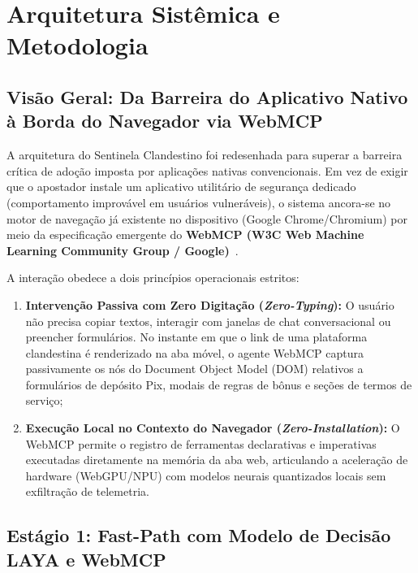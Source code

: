\section{Arquitetura Sist\^{e}mica e Metodologia}
\label{sec:arquitetura}

\subsection{Vis\~{a}o Geral: Da Barreira do Aplicativo Nativo \`{a} Borda do Navegador via WebMCP}

A arquitetura do Sentinela Clandestino foi redesenhada para superar a barreira cr\'{i}tica de ado\c{c}\~{a}o imposta por aplica\c{c}\~{o}es nativas convencionais. Em vez de exigir que o apostador instale um aplicativo utilit\'{a}rio de seguran\c{c}a dedicado (comportamento improv\'{a}vel em usu\'{a}rios vulner\'{a}veis), o sistema ancora-se no motor de navega\c{c}\~{a}o j\'{a} existente no dispositivo (Google Chrome/Chromium) por meio da especifica\c{c}\~{a}o emergente do \textbf{WebMCP (W3C Web Machine Learning Community Group / Google)}~\cite{w3c2025webmcp}.

A intera\c{c}\~{a}o obedece a dois princ\'{i}pios operacionais estritos:
\begin{enumerate}
    \item \textbf{Interven\c{c}\~{a}o Passiva com Zero Digita\c{c}\~{a}o (\textit{Zero-Typing}):} O usu\'{a}rio n\~{a}o precisa copiar textos, interagir com janelas de chat conversacional ou preencher formul\'{a}rios. No instante em que o link de uma plataforma clandestina \'{e} renderizado na aba m\'{o}vel, o agente WebMCP captura passivamente os n\'{o}s do Document Object Model (DOM) relativos a formul\'{a}rios de dep\'{o}sito Pix, modais de regras de b\^{o}nus e se\c{c}\~{o}es de termos de servi\c{c}o;
    \item \textbf{Execu\c{c}\~{a}o Local no Contexto do Navegador (\textit{Zero-Installation}):} O WebMCP permite o registro de ferramentas declarativas e imperativas executadas diretamente na mem\'{o}ria da aba web, articulando a acelera\c{c}\~{a}o de hardware (WebGPU/NPU) com modelos neurais quantizados locais sem exfiltra\c{c}\~{a}o de telemetria.
\end{enumerate}

\subsection{Est\'{a}gio 1: Fast-Path com Modelo de Decis\~{a}o LAYA e WebMCP}

